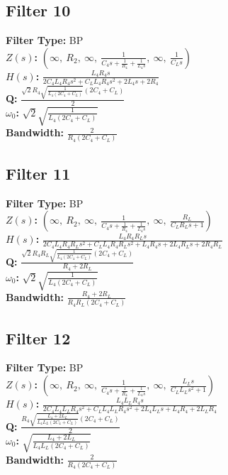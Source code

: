 \documentclass{article}
\begin{document}
\subsection*{Filter 10}
\textbf{Filter Type:} BP \\ 
\textbf{$Z(s)$:} $\left( \infty, \  R_{2}, \  \infty, \  \frac{1}{C_{4} s + \frac{1}{R_{4}} + \frac{1}{L_{4} s}}, \  \infty, \  \frac{1}{C_{L} s}\right)$ \\ 
\textbf{$H(s)$:} $\frac{L_{4} R_{4} s}{2 C_{4} L_{4} R_{4} s^{2} + C_{L} L_{4} R_{4} s^{2} + 2 L_{4} s + 2 R_{4}}$ \\ 
\textbf{Q:} $\frac{\sqrt{2} R_{4} \sqrt{\frac{1}{L_{4} \left(2 C_{4} + C_{L}\right)}} \left(2 C_{4} + C_{L}\right)}{2}$ \\ 
\textbf{$\omega_0$:} $\sqrt{2} \sqrt{\frac{1}{L_{4} \left(2 C_{4} + C_{L}\right)}}$ \\ 
\textbf{Bandwidth:} $\frac{2}{R_{4} \left(2 C_{4} + C_{L}\right)}$ \\ 
\subsection*{Filter 11}
\textbf{Filter Type:} BP \\ 
\textbf{$Z(s)$:} $\left( \infty, \  R_{2}, \  \infty, \  \frac{1}{C_{4} s + \frac{1}{R_{4}} + \frac{1}{L_{4} s}}, \  \infty, \  \frac{R_{L}}{C_{L} R_{L} s + 1}\right)$ \\ 
\textbf{$H(s)$:} $\frac{L_{4} R_{4} R_{L} s}{2 C_{4} L_{4} R_{4} R_{L} s^{2} + C_{L} L_{4} R_{4} R_{L} s^{2} + L_{4} R_{4} s + 2 L_{4} R_{L} s + 2 R_{4} R_{L}}$ \\ 
\textbf{Q:} $\frac{\sqrt{2} R_{4} R_{L} \sqrt{\frac{1}{L_{4} \left(2 C_{4} + C_{L}\right)}} \left(2 C_{4} + C_{L}\right)}{R_{4} + 2 R_{L}}$ \\ 
\textbf{$\omega_0$:} $\sqrt{2} \sqrt{\frac{1}{L_{4} \left(2 C_{4} + C_{L}\right)}}$ \\ 
\textbf{Bandwidth:} $\frac{R_{4} + 2 R_{L}}{R_{4} R_{L} \left(2 C_{4} + C_{L}\right)}$ \\ 
\subsection*{Filter 12}
\textbf{Filter Type:} BP \\ 
\textbf{$Z(s)$:} $\left( \infty, \  R_{2}, \  \infty, \  \frac{1}{C_{4} s + \frac{1}{R_{4}} + \frac{1}{L_{4} s}}, \  \infty, \  \frac{L_{L} s}{C_{L} L_{L} s^{2} + 1}\right)$ \\ 
\textbf{$H(s)$:} $\frac{L_{4} L_{L} R_{4} s}{2 C_{4} L_{4} L_{L} R_{4} s^{2} + C_{L} L_{4} L_{L} R_{4} s^{2} + 2 L_{4} L_{L} s + L_{4} R_{4} + 2 L_{L} R_{4}}$ \\ 
\textbf{Q:} $\frac{R_{4} \sqrt{\frac{L_{4} + 2 L_{L}}{L_{4} L_{L} \left(2 C_{4} + C_{L}\right)}} \left(2 C_{4} + C_{L}\right)}{2}$ \\ 
\textbf{$\omega_0$:} $\sqrt{\frac{L_{4} + 2 L_{L}}{L_{4} L_{L} \left(2 C_{4} + C_{L}\right)}}$ \\ 
\textbf{Bandwidth:} $\frac{2}{R_{4} \left(2 C_{4} + C_{L}\right)}$ \\ 
\end{document}
